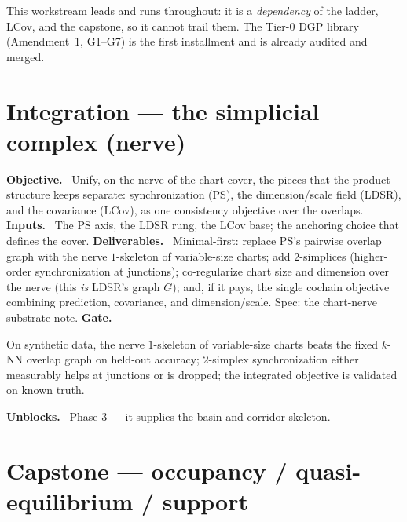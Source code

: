 \documentclass[11pt]{article}
\newcommand{\field}[1]{\smallskip\noindent\textbf{\textsf{#1.}}\ }
\begin{document}
\begin{note}
This workstream leads and runs throughout: it is a \emph{dependency} of the ladder,
LCov, and the capstone, so it cannot trail them. The Tier-0 DGP library
(Amendment~1, G1--G7) is the first installment and is already audited and merged.
\end{note}

\section{Integration --- the simplicial complex (nerve)}\label{sec:nerve}

\field{Objective} Unify, on the nerve of the chart cover, the pieces that the
product structure keeps separate: synchronization (PS), the dimension/scale field
(LDSR), and the covariance (LCov), as one consistency objective over the overlaps.
\field{Inputs} The PS axis, the LDSR rung, the LCov base; the anchoring choice that
defines the cover.
\field{Deliverables} Minimal-first: replace PS's pairwise overlap graph with the
nerve $1$-skeleton of variable-size charts; add $2$-simplices (higher-order
synchronization at junctions); co-regularize chart size and dimension over the nerve
(this \emph{is} LDSR's graph $G$); and, if it pays, the single cochain objective
combining prediction, covariance, and dimension/scale. Spec: the chart-nerve
substrate note.
\field{Gate} \begin{gate} On synthetic data, the nerve $1$-skeleton of variable-size
charts beats the fixed $k$-NN overlap graph on held-out accuracy; $2$-simplex
synchronization either measurably helps at junctions or is dropped; the integrated
objective is validated on known truth.\end{gate}
\field{Unblocks} Phase 3 --- it supplies the basin-and-corridor skeleton.

\section{Capstone --- occupancy / quasi-equilibrium / support}\label{sec:capstone}
\end{document}
